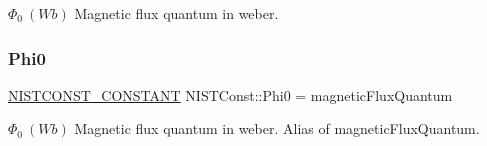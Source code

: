 $\Phi_0 \ (Wb)$ Magnetic flux quantum in weber. \mbox{\label{group___n_i_s_t_const-_magnetic_flux_quantum_ga7319d9ef42b2a4a6c6047ee1d0c3eaed}} 
\subsubsection{\texorpdfstring{Phi0}{Phi0}}
{\footnotesize\ttfamily \mbox{\hyperlink{group___n_i_s_t_const-_macros_ga2b0fc1d7452373f816175dd86ce26729}{N\+I\+S\+T\+C\+O\+N\+S\+T\+\_\+\+C\+O\+N\+S\+T\+A\+NT}} N\+I\+S\+T\+Const\+::\+Phi0 = magnetic\+Flux\+Quantum}

$\Phi_0 \ (Wb)$ Magnetic flux quantum in weber. Alias of magnetic\+Flux\+Quantum. 